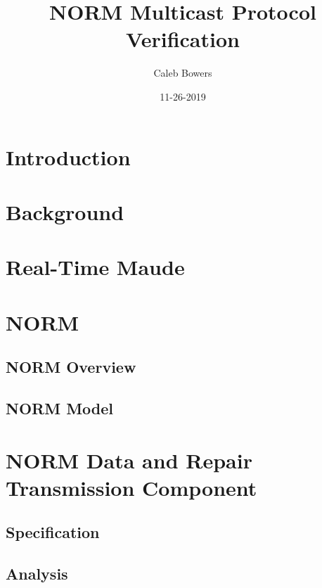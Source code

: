 \documentclass[10pt, journal]{IEEEtran}
\title{NORM Multicast Protocol Verification}
\author{Caleb Bowers}
\date{11-26-2019}
\begin{document}
\maketitle

\section{Introduction}

\section{Background}

\section{Real-Time Maude}

\section{NORM}

\subsection{NORM Overview}

\subsection{NORM Model}

\section{NORM Data and Repair Transmission Component}

\subsection{Specification}

\subsection{Analysis}
\end{document}
